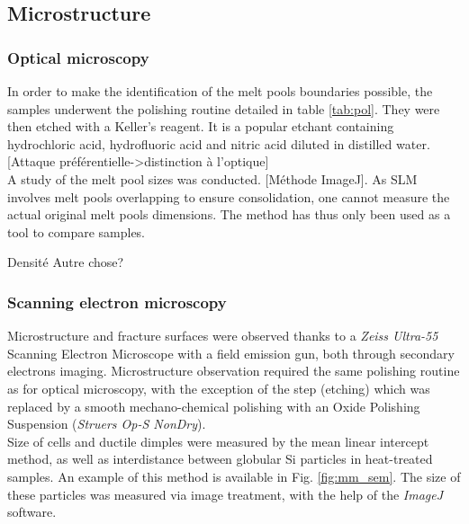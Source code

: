 \subsection{Microstructure}

\subsubsection{Optical microscopy}
\label{MMOM}

In order to make the identification of the melt pools boundaries possible, the samples underwent the polishing routine detailed in table \ref{tab:pol}. They were then etched with	a Keller's reagent. It is a popular etchant containing hydrochloric acid, hydrofluoric acid and nitric acid diluted in distilled water. [Attaque préférentielle->distinction à l'optique] \\

A study of the melt pool sizes was conducted. [Méthode ImageJ]. As SLM involves melt pools overlapping to ensure consolidation, one cannot measure the actual original melt pools dimensions. The method has thus only been used as a tool to compare samples.

Densité
Autre chose?

\subsubsection{Scanning electron microscopy}

Microstructure and fracture surfaces were observed thanks to a \textit{Zeiss Ultra-55} Scanning Electron Microscope with a field emission gun, both through secondary electrons imaging. Microstructure observation required the same polishing routine as for optical microscopy, with the exception of the step (etching) which was replaced by a smooth mechano-chemical polishing with an Oxide Polishing Suspension (\textit{Struers Op-S NonDry}).\\

Size of cells and ductile dimples were measured by the mean linear intercept method, as well as interdistance between globular Si particles in heat-treated samples. An example of this method is available in Fig. \ref{fig:mm_sem}. The size of these particles was measured via image treatment, with the help of the \textit{ImageJ} software.\\

